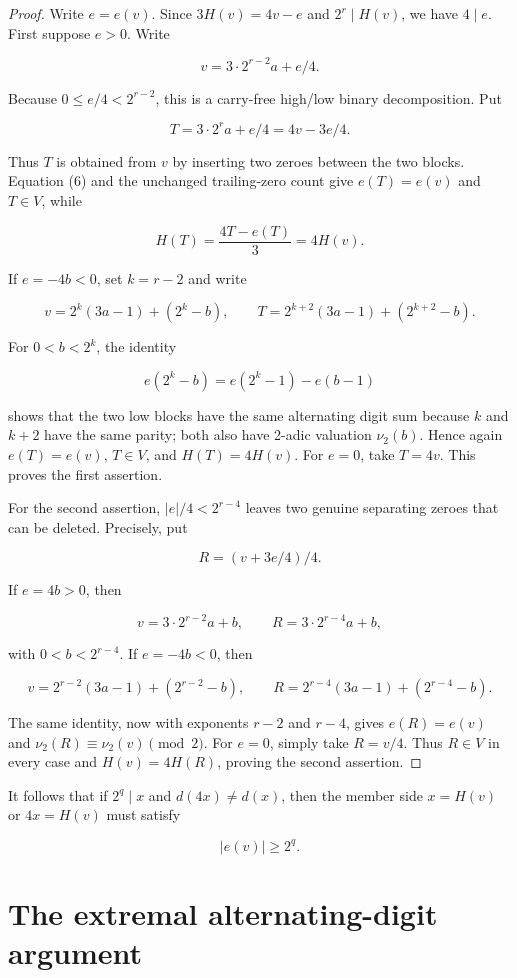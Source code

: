 \documentclass[11pt]{article}
\numberwithin{equation}{section}
\begin{document}
\begin{proof}


Write $e=e(v)$. Since $3H(v)=4v-e$ and $2^r\mid H(v)$, we have $4\mid e$.
First suppose $e>0$. Write

\[
v=3\cdot2^{r-2}a+e/4.
\]

Because $0\leq e/4<2^{r-2}$, this is a carry-free high/low binary decomposition. Put

\[
T=3\cdot2^ra+e/4=4v-3e/4.
\]

Thus $T$ is obtained from $v$ by inserting two zeroes between the two blocks. Equation (6) and
the unchanged trailing-zero count give $e(T)=e(v)$ and $T\in V$, while

\[
H(T)=\frac{4T-e(T)}3=4H(v).
\]

If $e=-4b<0$, set $k=r-2$ and write

\[
v=2^k(3a-1)+(2^k-b),\qquad
T=2^{k+2}(3a-1)+(2^{k+2}-b).
\]

For $0<b<2^k$, the identity

\[
e(2^k-b)=e(2^k-1)-e(b-1)
\]

shows that the two low blocks have the same alternating digit sum because $k$ and $k+2$ have the
same parity; both also have 2-adic valuation $\nu_2(b)$. Hence again $e(T)=e(v)$, $T\in V$, and
$H(T)=4H(v)$. For $e=0$, take $T=4v$. This proves the first assertion.

For the second assertion, $|e|/4<2^{r-4}$ leaves two genuine separating zeroes that can be
deleted. Precisely, put

\[
R=(v+3e/4)/4.
\]

If $e=4b>0$, then

\[
v=3\cdot2^{r-2}a+b,\qquad R=3\cdot2^{r-4}a+b,
\]

with $0<b<2^{r-4}$. If $e=-4b<0$, then

\[
v=2^{r-2}(3a-1)+(2^{r-2}-b),\qquad
R=2^{r-4}(3a-1)+(2^{r-4}-b).
\]

The same identity, now with exponents $r-2$ and $r-4$, gives $e(R)=e(v)$ and
$\nu_2(R)\equiv\nu_2(v)\pmod2$. For $e=0$, simply take $R=v/4$. Thus $R\in V$ in every
case and $H(v)=4H(R)$, proving the second assertion.
\end{proof}


It follows that if $2^q\mid x$ and $d(4x)\neq d(x)$, then the member side $x=H(v)$ or
$4x=H(v)$ must satisfy

\[
|e(v)|\geq2^q.
\tag{8}
\]

\section{The extremal alternating-digit argument}
\end{document}
